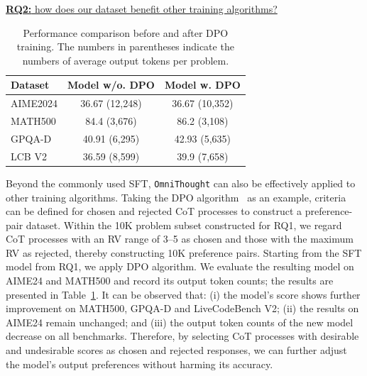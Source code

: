 \documentclass{article}
\begin{document}
\underline{\textbf{RQ2:} how does our dataset benefit other training algorithms?}


\begin{table}
    \centering
    \caption{Performance comparison before and after DPO training. The numbers in parentheses indicate the numbers of average output tokens per problem. }
    \begin{small}
    \begin{tabular}{l|c|c}
        \hline
        \textbf{Dataset} & \textbf{Model w/o. DPO} & \textbf{Model w. DPO}\\
        \hline
        AIME2024 & 36.67 (12,248) & 36.67 (10,352)\\
        MATH500	& 84.4 (3,676) & 86.2 (3,108)\\
        GPQA-D & 40.91 (6,295) & 42.93 (5,635)\\
        LCB V2 & 36.59 (8,599) & 39.9 (7,658)\\
        \hline
    \end{tabular}
    \end{small}
    \label{tab:dpo}
\end{table}


Beyond the commonly used SFT, \texttt{OmniThought} can also be effectively applied to other training algorithms. Taking the DPO algorithm~\cite{DBLP:conf/nips/RafailovSMMEF23} as an example, criteria can be defined for chosen and rejected CoT processes to construct a preference-pair dataset. Within the 10K problem subset constructed for RQ1, we regard CoT processes with an RV range of 3–5 as chosen and those with the maximum RV as rejected, thereby constructing 10K preference pairs. Starting from the SFT model from RQ1, we apply DPO algorithm. We evaluate the resulting model on AIME24 and MATH500 and record its output token counts; the results are presented in Table~\ref{tab:dpo}. It can be observed that: (i) the model’s score shows further improvement on MATH500, GPQA-D and LiveCodeBench V2; (ii) the results on AIME24 remain unchanged; and (iii) the output token counts of the new model decrease on all benchmarks. Therefore, by selecting CoT processes with desirable and undesirable scores as chosen and rejected responses, we can further adjust the model's output preferences without harming its accuracy.







\end{document}
